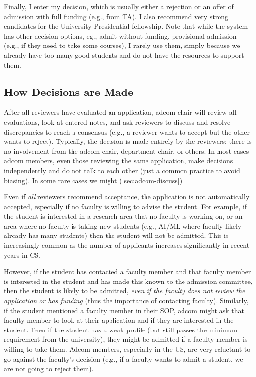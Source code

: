 \documentclass[oneside,11pt,dvipsnames]{book}
\begin{document}
Finally, I enter my decision, which is usually either a rejection or an offer of admission with full funding (e.g., from TA). I also recommend very strong candidates for the University Presidential fellowship. Note that while the system has other decision options, eg., admit without funding, provisional admission (e.g., if they need to take some courses), I rarely use them, simply because we already have too many good students and do not have the resources to support them.  

\subsection{How Decisions are Made}\label{sec:how-decisions}


After all reviewers have evaluated an application, adcom chair will review all evaluations, look at entered notes, and ask reviewers to discuss and resolve discrepancies to reach a consensus (e.g., a reviewer wants to accept but the other wants to reject).  Typically, the decision is made entirely by the reviewers; there is no involvement from the adcom chair, department chair, or others. In most cases adcom members, even those reviewing the same application, make decisions independently and do not talk to each other (just a common practice to avoid biasing). In some rare cases we might (\autoref{sec:adcom-discuss}). 


Even if \emph{all} reviewers recommend acceptance, the application is not automatically accepted, especially if no faculty is willing to advise the student. For example, if the student is interested in a research area that no faculty is working on, or an area where no faculty is taking new students (e.g., AI/ML where faculty likely already has many students) then the student will not be admitted.  This is increasingly common as the number of applicants increases significantly in recent years in CS.

However, if the student has contacted a faculty member and that faculty member is interested in the student and has made this known to the admission committee, then the student is likely to be admitted, \emph{even if the faculty does not review the application or has funding} (thus the importance of contacting faculty). 
Similarly, if the student mentioned a faculty member in their SOP, adcom might ask that faculty member to look at their application and if they are interested in the student.  Even if the student has a weak profile (but still passes the minimum requirement from the university), they might be admitted if a faculty member is willing to take them. Adcom members, especially in the US, are very reluctant to go against the faculty's decision (e.g., if a faculty wants to admit a student, we are not going to reject them).
\end{document}
